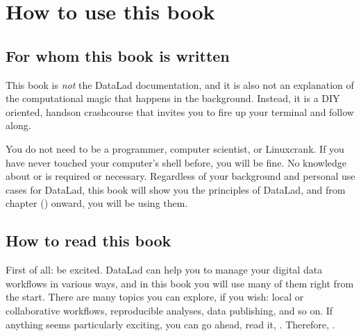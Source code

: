 \chapter{How to use this book}
\label{\detokenize{intro/narrative:how-to-use-this-book}}\label{\detokenize{intro/narrative::doc}}


\section{For whom this book is written}
\label{\detokenize{intro/narrative:for-whom-this-book-is-written}}
\sphinxAtStartPar
This book is \textit{not} the DataLad documentation, and it is also
not an explanation of the computational magic that happens in the background.
Instead, it is a DIY oriented, hands\sphinxhyphen{}on crash\sphinxhyphen{}course that invites
you to fire up your terminal and follow along.

\sphinxAtStartPar
{}

\sphinxAtStartPar
You do not need to be a programmer, computer scientist, or Linux\sphinxhyphen{}crank.
If you have never touched your computer’s shell before, you will be fine.
No knowledge about {\hyperref[\detokenize{glossary:term-Git}]{}} or {\hyperref[\detokenize{glossary:term-git-annex}]{}} is required or necessary.
Regardless of your background and personal use cases for DataLad, this
book will show you the principles of DataLad, and from chapter {\hyperref[\detokenize{basics/101-101-create:createds}]{}} () onward,
you will be using them.


\section{How to read this book}
\label{\detokenize{intro/narrative:how-to-read-this-book}}
\sphinxAtStartPar
First of all: be excited. DataLad can help you to manage your digital data
workflows in various ways, and in this book you will use many of them right
from the start.
There are many topics you can explore, if you wish:
local or collaborative workflows, reproducible analyses, data publishing, and so on.
If anything seems particularly exciting, you can go ahead, read it, .
Therefore, .

